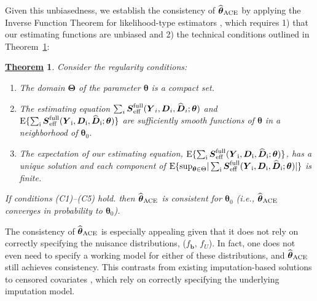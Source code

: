 \documentclass[12pt]{article}
\def\wh{\widehat}
\def\wh{\widehat}
\def\bS{{\mathbf S}}
\def\btheta{{\boldsymbol{\theta}}}
\def\bb{{\boldsymbol b}}
\def\bD{{\boldsymbol D}}
\def\bS{{\boldsymbol S}}
\def\bY{{\boldsymbol Y}}
\def\tilD{\bD}
\def\ACEest{\wh{\btheta}_{\rm ACE}}
\def\E{\rm E}
\newtheorem{Th}{\underline{\bf Theorem}}
\begin{document}
Given this unbiasedness, we establish the consistency of $\ACEest$ by applying the Inverse Function Theorem for likelihood-type estimators \citep{foutz1977unique}, which requires 1) that our estimating functions are unbiased and 2) the technical conditions outlined in Theorem~\ref{theorem:consistency}:
\begin{Th}
\label{theorem:consistency}
Consider the regularity conditions:
\begin{enumerate}
    \item[(C3)] The domain $\boldsymbol{\Theta}$ of the parameter $\btheta$ is a compact set.
    \item[(C4)] The estimating equation $\sum_i\bS_{\rm{eff}}^{\rm{full}}(\bY_i,\tilD_i,\widehat{\tilD}_i;\btheta)$ and $\E\{\sum_i\bS_{\rm{eff}}^{\rm{full}}(\bY_i,\tilD_i,\widehat{\tilD}_i;\btheta)\}$ are sufficiently smooth functions of $\btheta$ in a neighborhood of $\btheta_0$.
    \item[(C5)] The expectation of our estimating equation, $\E\{\sum_i\bS_{\rm{eff}}^{\rm{full}}(\bY_i,\tilD_i,\widehat{\tilD}_i;\btheta)\}$, has a unique solution and each component of $\E\{{\rm sup}_{\btheta \in \Theta}|\sum_i\bS_{\rm{eff}}^{\rm{full}}(\bY_i,\tilD_i,\widehat{\tilD}_i;\btheta)|\}$ is finite.
\end{enumerate}
If conditions (C1)--(C5) hold. then $\ACEest$ is consistent for $\btheta_0$ (i.e., $\ACEest$ converges in probability to $\btheta_0$).
\end{Th}

The consistency of $\ACEest$ is especially appealing given that it does not rely on correctly specifying the nuisance distributions, ($f_{\bb}$, $f_U$). In fact, one does not even need to specify a working model for either of these distributions, and $\ACEest$ still achieves consistency. This contrasts from existing imputation-based solutions to censored covariates \citep{Wang2012, Bernhardt2014, Wei2018, Atem2019, yu2021quantile}, which rely on correctly specifying the underlying imputation model.

\end{document}
